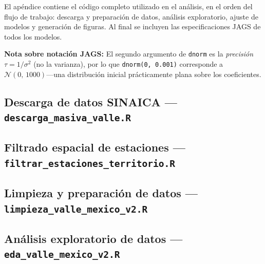 \documentclass[12pt]{article}
\begin{document}
El ap\'endice contiene el c\'odigo completo utilizado en el an\'alisis,
en el orden del flujo de trabajo: descarga y preparaci\'on de datos,
an\'alisis exploratorio, ajuste de modelos y generaci\'on de figuras.
Al final se incluyen las especificaciones JAGS de todos los modelos.

\noindent\textbf{Nota sobre notaci\'on JAGS:} El segundo argumento de
\texttt{dnorm} es la \emph{precisi\'on} $\tau = 1/\sigma^2$
(no la varianza), por lo que \texttt{dnorm(0, 0.001)} corresponde a
$\mathcal{N}(0,\,1000)$---una distribuci\'on inicial pr\'acticamente
plana sobre los coeficientes.

\subsection*{Descarga de datos SINAICA ---
             \texttt{descarga\_masiva\_valle.R}}


\subsection*{Filtrado espacial de estaciones ---
             \texttt{filtrar\_estaciones\_territorio.R}}


\subsection*{Limpieza y preparaci\'on de datos ---
             \texttt{limpieza\_valle\_mexico\_v2.R}}


\subsection*{An\'alisis exploratorio de datos ---
             \texttt{eda\_valle\_mexico\_v2.R}}

\end{document}
